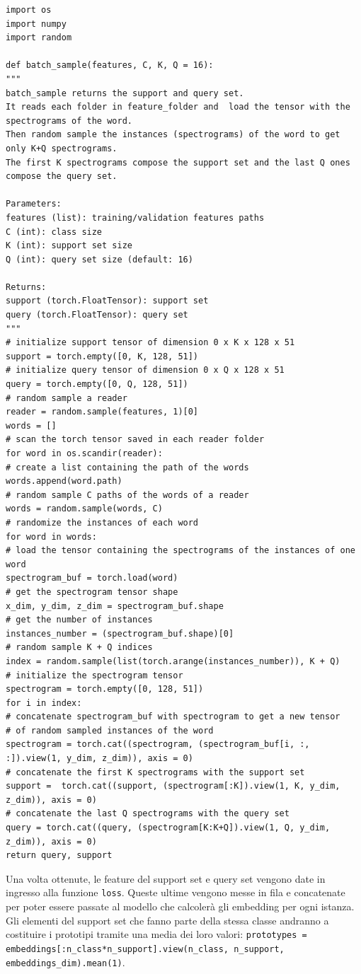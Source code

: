 \documentclass[12pt,a4paper,titlepage]{article}
\begin{document}
\begin{lstlisting}[language=iPython,firstnumber=1, caption=words\_per\_reader.py, label=words_per_reader,captionpos=b]
import os
import numpy
import random

def batch_sample(features, C, K, Q = 16):
"""
batch_sample returns the support and query set. 
It reads each folder in feature_folder and  load the tensor with the spectrograms of the word.
Then random sample the instances (spectrograms) of the word to get only K+Q spectrograms. 
The first K spectrograms compose the support set and the last Q ones compose the query set.

Parameters:
features (list): training/validation features paths
C (int): class size
K (int): support set size
Q (int): query set size (default: 16)

Returns:
support (torch.FloatTensor): support set
query (torch.FloatTensor): query set
"""
# initialize support tensor of dimension 0 x K x 128 x 51
support = torch.empty([0, K, 128, 51])
# initialize query tensor of dimension 0 x Q x 128 x 51
query = torch.empty([0, Q, 128, 51])
# random sample a reader
reader = random.sample(features, 1)[0]
words = []
# scan the torch tensor saved in each reader folder
for word in os.scandir(reader):
# create a list containing the path of the words
words.append(word.path)
# random sample C paths of the words of a reader
words = random.sample(words, C)
# randomize the instances of each word
for word in words:
# load the tensor containing the spectrograms of the instances of one word
spectrogram_buf = torch.load(word)
# get the spectrogram tensor shape
x_dim, y_dim, z_dim = spectrogram_buf.shape
# get the number of instances
instances_number = (spectrogram_buf.shape)[0]
# random sample K + Q indices
index = random.sample(list(torch.arange(instances_number)), K + Q)
# initialize the spectrogram tensor
spectrogram = torch.empty([0, 128, 51])
for i in index:
# concatenate spectrogram_buf with spectrogram to get a new tensor 
# of random sampled instances of the word
spectrogram = torch.cat((spectrogram, (spectrogram_buf[i, :, :]).view(1, y_dim, z_dim)), axis = 0)
# concatenate the first K spectrograms with the support set
support =  torch.cat((support, (spectrogram[:K]).view(1, K, y_dim, z_dim)), axis = 0)
# concatenate the last Q spectrograms with the query set
query = torch.cat((query, (spectrogram[K:K+Q]).view(1, Q, y_dim, z_dim)), axis = 0)
return query, support
\end{lstlisting}
Una volta ottenute, le feature del support set e query set vengono date in ingresso alla funzione \texttt{loss}.
Queste ultime vengono messe in fila e concatenate per poter essere passate al modello che calcolerà gli embedding per ogni istanza.
Gli elementi del support set che fanno parte della stessa classe andranno a costituire i prototipi tramite una media dei loro valori: \texttt{prototypes = embeddings[:n\_class*n\_support].view(n\_class, n\_support, embeddings\_dim).mean(1)}.
\end{document}
